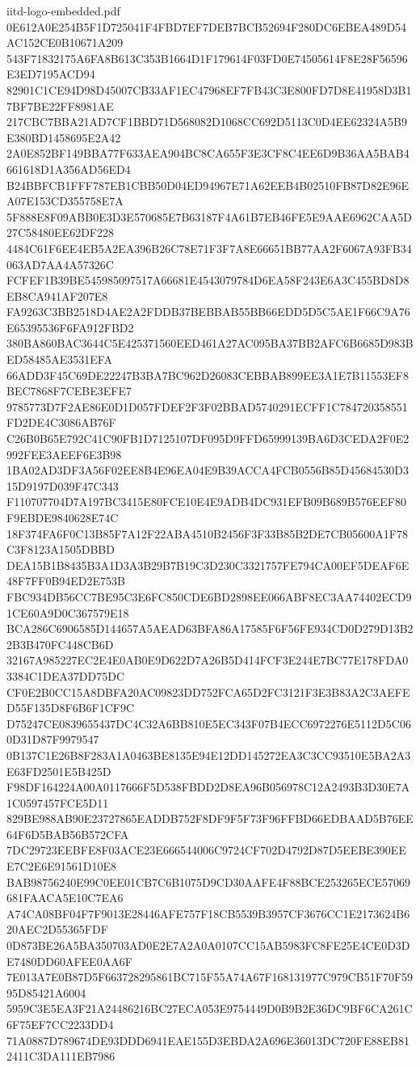 \begin{filecontents*}[overwrite]{iitd-logo-embedded.pdf}
0E612A0E254B5F1D725041F4FBD7EF7DEB7BCB52694F280DC6EBEA489D54AC152CE0B10671A209
543F71832175A6FA8B613C353B1664D1F179614F03FD0E74505614F8E28F56596E3ED7195ACD94
82901C1CE94D98D45007CB33AF1EC47968EF7FB43C3E800FD7D8E41958D3B17BF7BE22FF8981AE
217CBC7BBA21AD7CF1BBD71D568082D1068CC692D5113C0D4EE62324A5B9E380BD1458695E2A42
2A0E852BF149BBA77F633AEA904BC8CA655F3E3CF8C4EE6D9B36AA5BAB4661618D1A356AD56ED4
B24BBFCB1FFF787EB1CBB50D04ED94967E71A62EEB4B02510FB87D82E96EA07E153CD355758E7A
5F888E8F09ABB0E3D3E570685E7B63187F4A61B7EB46FE5E9AAE6962CAA5D27C58480EE62DF228
4484C61F6EE4EB5A2EA396B26C78E71F3F7A8E66651BB77AA2F6067A93FB34063AD7AA4A57326C
FCFEF1B39BE545985097517A66681E4543079784D6EA58F243E6A3C455BD8D8EB8CA941AF207E8
FA9263C3BB2518D4AE2A2FDDB37BEBBAB55BB66EDD5D5C5AE1F66C9A76E65395536F6FA912FBD2
380BA860BAC3644C5E425371560EED461A27AC095BA37BB2AFC6B6685D983BED58485AE3531EFA
66ADD3F45C69DE22247B3BA7BC962D26083CEBBAB899EE3A1E7B11553EF8BEC7868F7CEBE3EFE7
9785773D7F2AE86E0D1D057FDEF2F3F02BBAD5740291ECFF1C784720358551FD2DE4C3086AB76F
C26B0B65E792C41C90FB1D7125107DF095D9FFD65999139BA6D3CEDA2F0E2992FEE3AEEF6E3B98
1BA02AD3DF3A56F02EE8B4E96EA04E9B39ACCA4FCB0556B85D45684530D315D9197D039F47C343
F110707704D7A197BC3415E80FCE10E4E9ADB4DC931EFB09B689B576EEF80F9EBDE9840628E74C
18F374FA6F0C13B85F7A12F22ABA4510B2456F3F33B85B2DE7CB05600A1F78C3F8123A1505DBBD
DEA15B1B8435B3A1D3A3B29B7B19C3D230C3321757FE794CA00EF5DEAF6E48F7FF0B94ED2E753B
FBC934DB56CC7BE95C3E6FC850CDE6BD2898EE066ABF8EC3AA74402ECD91CE60A9D0C367579E18
BCA286C6906585D144657A5AEAD63BFA86A17585F6F56FE934CD0D279D13B22B3B470FC448CB6D
32167A985227EC2E4E0AB0E9D622D7A26B5D414FCF3E244E7BC77E178FDA03384C1DEA37DD75DC
CF0E2B0CC15A8DBFA20AC09823DD752FCA65D2FC3121F3E3B83A2C3AEFED55F135D8F6B6F1CF9C
D75247CE0839655437DC4C32A6BB810E5EC343F07B4ECC6972276E5112D5C060D31D87F9979547
0B137C1E26B8F283A1A0463BE8135E94E12DD145272EA3C3CC93510E5BA2A3E63FD2501E5B425D
F98DF164224A00A0117666F5D538FBDD2D8EA96B056978C12A2493B3D30E7A1C0597457FCE5D11
829BE988AB90E23727865EADDB752F8DF9F5F73F96FFBD66EDBAAD5B76EE64F6D5BAB56B572CFA
7DC29723EEBFE8F03ACE23E666544006C9724CF702D4792D87D5EEBE390EEE7C2E6E91561D10E8
BAB98756240E99C0EE01CB7C6B1075D9CD30AAFE4F88BCE253265ECE57069681FAACA5E10C7EA6
A74CA08BF04F7F9013E28446AFE757F18CB5539B3957CF3676CC1E2173624B620AEC2D55365FDF
0D873BE26A5BA350703AD0E2E7A2A0A0107CC15AB5983FC8FE25E4CE0D3DE7480DD60AFEE0AA6F
7E013A7E0B87D5F663728295861BC715F55A74A67F168131977C979CB51F70F5995D85421A6004
5959C3E5EA3F21A24486216BC27ECA053E9754449D0B9B2E36DC9BF6CA261C6F75EF7CC2233DD4
71A0887D789674DE93DDD6941EAE155D3EBDA2A696E36013DC720FE88EB812411C3DA111EB7986

\end{filecontents*}
